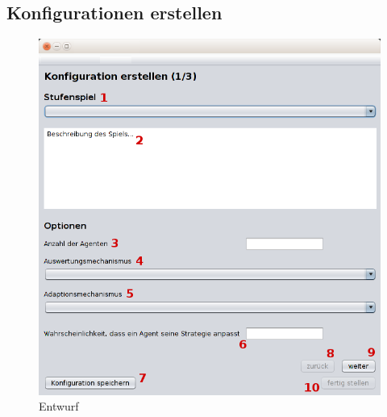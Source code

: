\subsection{Konfigurationen erstellen}

\begin{figure}[hp] 
  \centering
     \includegraphics[width=1.0\textwidth]{GUI_Entwurf/WizardFenster1.png}
  \caption{Entwurf}
  \label{fig:Bild1}
\end{figure}

